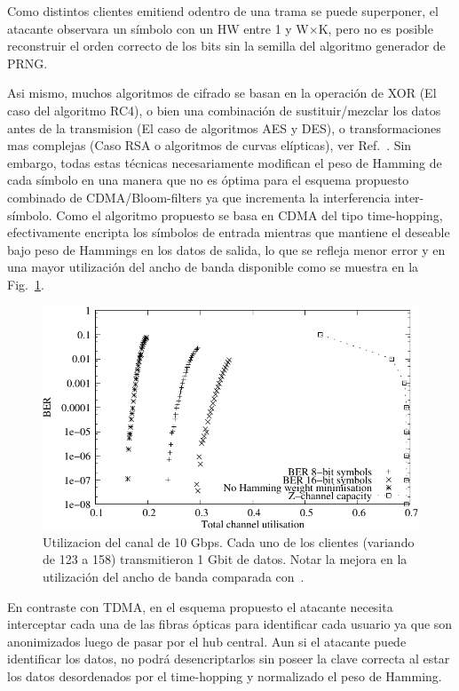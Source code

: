 Como distintos clientes emitiend odentro de una trama se puede superponer, el atacante observara un símbolo con un HW entre 1 y W$\times$K, pero no es posible reconstruir el orden correcto de los bits sin la semilla del algoritmo generador de PRNG.

Asi mismo, muchos algoritmos de cifrado se basan en la operación de XOR (El caso del algoritmo RC4), o bien una combinación de sustituir/mezclar los datos antes de la transmision (El caso de algoritmos AES y DES), o transformaciones mas complejas (Caso RSA o algoritmos de curvas elípticas), ver Ref.~\cite{Menezes:1996:HAC:548089}.
Sin embargo, todas estas técnicas necesariamente modifican el peso de Hamming de cada símbolo en una manera que no es óptima para el esquema propuesto combinado de CDMA/Bloom-filters ya que incrementa la interferencia inter-símbolo.
Como el algoritmo propuesto se basa en CDMA del tipo time-hopping, efectivamente encripta los símbolos de entrada mientras que mantiene el deseable bajo peso de Hammings en los datos de salida, lo que se refleja menor error y en una mayor utilización del ancho de banda disponible como se muestra en la Fig.~\ref{fig_use}.

\begin{figure}[t]
  \centering
  \includegraphics[width=0.48 \textwidth]{BERvsChannel} 
  \caption{Utilizacion del canal de 10 Gbps. Cada uno de los clientes (variando de 123 a 158) transmitieron 1 Gbit de datos. Notar la mejora en la utilización del ancho de banda comparada con~\cite{ortega11}.}
  \label{fig_use}
\end{figure}

En contraste con TDMA, en el esquema propuesto el atacante necesita interceptar cada una de las fibras ópticas para identificar cada usuario ya que son anonimizados luego de pasar por el hub central. Aun si el atacante puede identificar los datos, no podrá desencriptarlos sin poseer la clave correcta al estar los datos desordenados por el time-hopping y normalizado el peso de Hamming.
